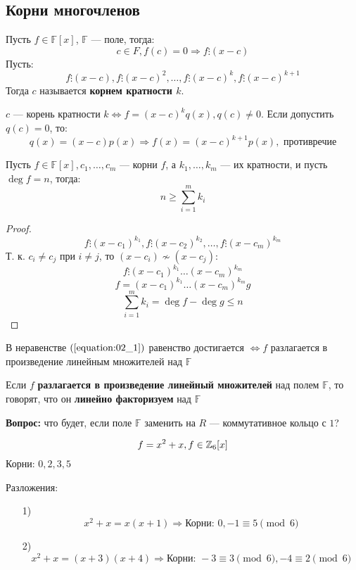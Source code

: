 \subsection{Корни многочленов}
\begin{definition}
Пусть $f \in \mathbb{F}[x]$, $\mathbb{F}$ --- поле, тогда:
\[
  c \in F, f(c) = 0 \Rightarrow f \vdots (x - c)
\]
Пусть:
\[
  f \vdots (x - c), f \vdots (x - c)^{2}, \ldots, f \vdots (x - c)^{k}, f \vdots (x - c)^{k + 1}
\]
Тогда $c$ называется \textbf{корнем кратности $k$}.
\end{definition}
\begin{note}
$c$ --- корень кратности $k \iff f = (x - c)^{k}q(x), q(c) \neq 0$. Если допустить $q(c) = 0$, то:
\[
  q(x) = (x - c)p(x) \Rightarrow f(x) = (x - c)^{k + 1}p(x), \text{ противречие}
\]
\end{note}
\begin{theorem}
\label{theorem:02_2}
  Пусть $f \in \mathbb{F}[x], c_1, \ldots, c_m$ --- корни $f$, а $k_1, \ldots, k_m$ --- их кратности, и пусть $\deg f = n$, тогда:
  \begin{equation}
    \label{equation:02_1}
    n \geq \sum_{i = 1}^{m} k_i
  \end{equation}
\end{theorem}
\begin{proof}
\[
  f \vdots (x - c_1)^{k_1}, f \vdots (x - c_2)^{k_2}, \ldots, f \vdots (x - c_m)^{k_m}
\]
Т. к. $c_i \neq c_j$ при $i \neq j$, то $(x - c_i) \not\sim (x - c_j)$:
\[
  f \vdots (x - c_1)^{k_1}\ldots(x - c_m)^{k_m}
\]
\[
  f = (x - c_1)^{k_1}\ldots(x - c_m)^{k_m}g
\]
\[
  \sum_{i = 1}^{m} k_i = \deg f - \deg g \leq n
\]
\end{proof}
\begin{note}
 В неравенстве $(\ref{equation:02_1})$ равенство достигается $\iff f$ разлагается в произведение линейным множителей над $\mathbb{F}$
\end{note}
\begin{definition}
  Если $f$ \textbf{разлагается в произведение линейный множителей} над полем $\mathbb{F}$, то говорят, что он \textbf{линейно факторизуем} над $\mathbb{F}$
\end{definition}
\textbf{Вопрос:} что будет, если поле $\mathbb{F}$ заменить на $R$ --- коммутативное кольцо с $1$?
\begin{example}
\[
f = x^{2} + x, f \in \mathbb{Z}_6[x]
\]
Корни: $0, 2, 3, 5$

Разложения:
\begin{itemize}
  \item [1) ] \[
  x^{2} + x = x(x + 1) \Rightarrow \text{Корни: } 0, -1 \equiv 5 \pmod 6
  \]
\item[ 2) ]
  \[
  x^{2} + x = (x + 3)(x + 4) \Rightarrow \text{Корни: } -3 \equiv 3 \pmod 6, -4 \equiv 2 \pmod 6
  \]
\end{itemize}
\end{example}

